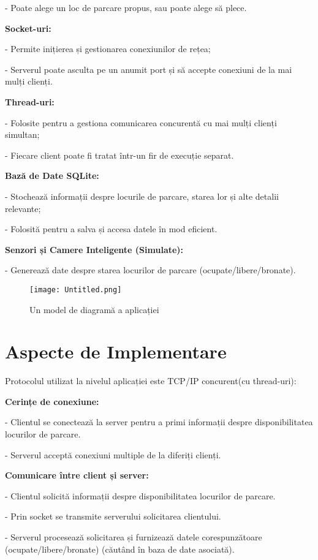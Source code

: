 \documentclass{article}
\begin{document}
- Poate alege un loc de parcare propus, sau poate alege să plece.

\textbf{Socket-uri:}

- Permite inițierea și gestionarea conexiunilor de rețea;

- Serverul poate asculta pe un anumit port și să accepte conexiuni de la mai mulți clienți.

\textbf{Thread-uri:}

- Folosite pentru a gestiona comunicarea concurentă cu mai mulți clienți simultan;

- Fiecare client poate fi tratat într-un fir de execuție separat.

\textbf{Bază de Date SQLite:}

- Stochează informații despre locurile de parcare, starea lor și alte detalii relevante;

- Folosită pentru a salva și accesa datele în mod eficient.

\textbf{Senzori și Camere Inteligente (Simulate):}

- Generează date despre starea locurilor de parcare (ocupate/libere/bronate).

\vspace{200pt}

\begin{figure}
    \centering
    \texttt{[image: Untitled.png]}
    \caption{Un model de diagramă a aplicației}
    \label{fig:enter-label}
\end{figure}

\section{Aspecte de Implementare}
Protocolul utilizat la nivelul aplicației este TCP/IP concurent(cu thread-uri):

\textbf{Cerințe de conexiune:}

- Clientul se conectează la server pentru a primi informații despre disponibilitatea locurilor de parcare.

- Serverul acceptă conexiuni multiple de la diferiți clienți.

\textbf{Comunicare între client și server:}

- Clientul solicită informații despre disponibilitatea locurilor de parcare.

- Prin socket se transmite serverului solicitarea clientului.

- Serverul procesează solicitarea și furnizează datele corespunzătoare (ocupate/libere/bronate) (căutând în baza de date asociată).
\end{document}
